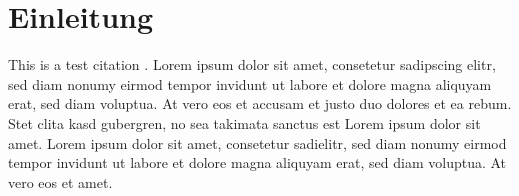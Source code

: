 \thispagestyle{plain}

\section{Einleitung}\label{introduction}

This is a test citation \cite{cry:2011}. Lorem ipsum dolor sit amet, consetetur
sadipscing elitr, sed diam nonumy eirmod tempor invidunt ut labore et dolore
magna aliquyam erat, sed diam voluptua. At vero eos et accusam et justo duo
dolores et ea rebum. Stet clita kasd gubergren, no sea takimata sanctus est
Lorem ipsum dolor sit amet. Lorem ipsum dolor sit amet, consetetur sadielitr,
sed diam nonumy eirmod tempor invidunt ut labore et dolore magna aliquyam erat,
sed diam voluptua. At vero eos et amet.